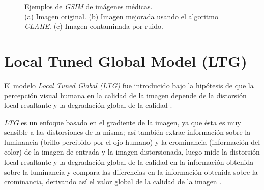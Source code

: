 \begin{figure}[H]
    \begin{center}
    \end{center}
    \caption{Ejemplos de \textit{GSIM} de imágenes médicas. \\
    (a) Imagen original.
    (b) Imagen mejorada usando el algoritmo \textit{CLAHE}.
    (c) Imagen contaminada por ruido.}
    \label{fig:gsm}
\end{figure}


\section{Local Tuned Global Model (LTG)}
\label{sec:ltg}
El modelo \textit{Local Tuned Global (LTG)} fue introducido bajo la hipótesis de que la percepción visual humana en la calidad de la imagen depende de la distorsión local resaltante y la degradación global de la calidad \cite{ltg2014}. 

\textit{LTG} es un enfoque basado en el gradiente de la imagen, ya que ésta es muy sensible a las distorsiones de la misma; así también extrae información sobre la luminancia (brillo percibido por el ojo humano) y la crominancia (información del color) de la imagen de entrada y la imagen distorsionada, luego mide la distorsión local resaltante y la degradación global de la calidad en la información obtenida sobre la luminancia y compara las diferencias en la información obtenida sobre la crominancia, derivando así el valor global de la calidad de la imagen \cite{jahne1999handbook}.
 
